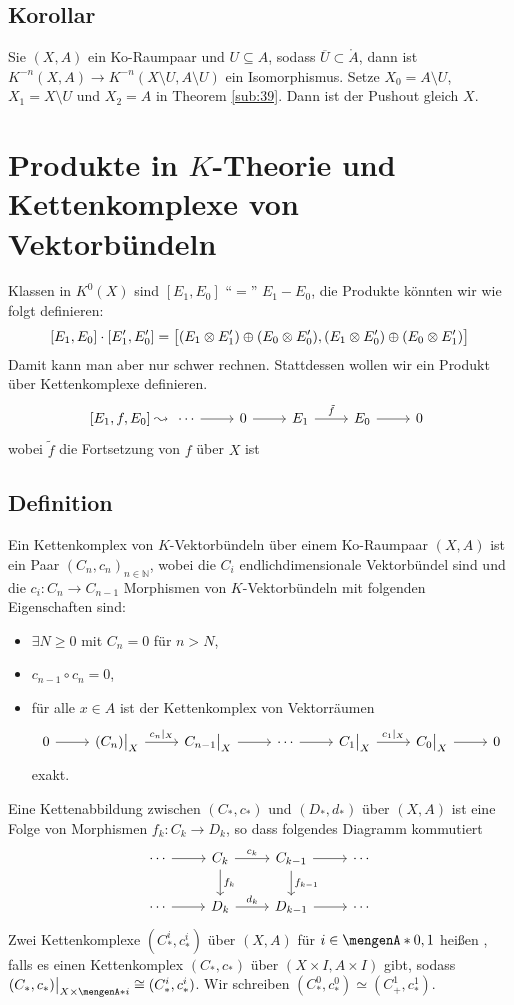 \subsection{Korollar} %
\label{sub:310}
Sie $(X,A)$ ein Ko-Raumpaar und $U \subseteq A$, sodass $\overline{U} \subset \mathring{A}$, dann ist $K^{-n}(X,A) \to K^{-n}(X \setminus U, A \setminus U)$ ein Isomorphismus.
Setze $X_0 = A \setminus U$, $X_1 = X \setminus U$ und $X_2=A$ in Theorem \ref{sub:39}. Dann ist der Pushout gleich $X$. \bewende

\section*{Produkte in $K$-Theorie und Kettenkomplexe von Vektorbündeln}
Klassen in $K^0(X)$ sind $[E_1,E_0]$ \enquote{$=$} $E_1 -E_0$, die Produkte könnten wir wie folgt definieren: 
\[
	[E_1,E_0] \cdot [E_1',E_0'] = \benbrace[\big]{(E_1\otimes E_1') \oplus (E_0 \otimes E_0'), (E_1 \otimes E_0')\oplus (E_0 \otimes E_1')} 
\]
Damit kann man aber nur schwer rechnen. Stattdessen wollen wir ein Produkt über Kettenkomplexe definieren.
\[
	\benbrace*{E_1,f,E_0}  \leadsto \begin{tikzcd}
		\cdots \rar & 0 \rar & E_1 \rar["\tilde{f}"] & E_0 \rar & 0 
	\end{tikzcd}
\]
wobei $\tilde{f}$ die Fortsetzung von $f$ über $X$ ist

\subsection*{Definition}
Ein Kettenkomplex von $K$-Vektorbündeln über einem Ko-Raumpaar $(X,A)$ ist ein Paar $(C_n,c_n)_{n \in \mathds{N}}$, wobei die $C_i$ endlichdimensionale Vektorbündel sind und 
die $c_i \colon C_n \to C_{n-1}$ Morphismen von $K$-Vektorbündeln mit folgenden Eigenschaften sind:
\begin{itemize}
	\item $\exists N \ge 0$ mit $C_n=0$ für $n >N$,
	\item $c_{n-1} \circ c_n =0$,
	\item für alle $x \in A$ ist der Kettenkomplex von Vektorräumen
	\[
		\begin{tikzcd}
			0 \rar & (C_n)\big|_{X} \rar["c_n|_X"] & C_{n-1}\big|_X \rar & \cdots \rar & C_1\big|_X \rar["c_1|_X"] & C_0\big|_X \rar & 0
		\end{tikzcd}
	\]
	exakt.
\end{itemize}
Eine Kettenabbildung zwischen $(C_*,c_*)$ und $(D_*,d_*)$ über $(X,A)$ ist eine Folge von Morphismen $f_k \colon C_k \to D_k$, so dass folgendes Diagramm kommutiert
\[
	\begin{tikzcd}
		\cdots \rar & C_k \rar["c_k"] \dar["f_k"] & C_{k-1} \rar \dar["f_{k-1}"]& \cdots \\
		\cdots \rar & D_k \rar["d_k"] & D_{k-1} \rar & \cdots
	\end{tikzcd}
\]
Zwei Kettenkomplexe $(C_*^i, c_*^i)$ über $(X,A)$ für $i \in \set{0,1}$ heißen , falls es einen Kettenkomplex $(C_*,c_*)$ über $(X\times I, A \times I)$ gibt,
sodass $(C_*,c_*)\big|_{X \times \set{i} } \cong (C_*^i,c_*^i)$. Wir schreiben $(C_*^0,c_*^0) \simeq (C_+^1, c_*^1)$.

